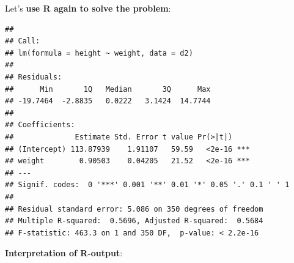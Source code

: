 \documentclass[
]{book}
\newenvironment{Shaded}{\begin{snugshade}}{\end{snugshade}}
\newcommand{\AttributeTok}[1]{\textcolor[rgb]{0.13,0.29,0.53}{#1}}
\newcommand{\DecValTok}[1]{\textcolor[rgb]{0.00,0.00,0.81}{#1}}
\newcommand{\FunctionTok}[1]{\textcolor[rgb]{0.13,0.29,0.53}{\textbf{#1}}}
\newcommand{\NormalTok}[1]{#1}
\newcommand{\OtherTok}[1]{\textcolor[rgb]{0.56,0.35,0.01}{#1}}
\newcommand{\SpecialCharTok}[1]{\textcolor[rgb]{0.81,0.36,0.00}{\textbf{#1}}}
\begin{document}
Let's \textbf{use R again to solve the problem}:

\begin{Shaded}
\end{Shaded}

\begin{verbatim}
## 
## Call:
## lm(formula = height ~ weight, data = d2)
## 
## Residuals:
##      Min       1Q   Median       3Q      Max 
## -19.7464  -2.8835   0.0222   3.1424  14.7744 
## 
## Coefficients:
##              Estimate Std. Error t value Pr(>|t|)    
## (Intercept) 113.87939    1.91107   59.59   <2e-16 ***
## weight        0.90503    0.04205   21.52   <2e-16 ***
## ---
## Signif. codes:  0 '***' 0.001 '**' 0.01 '*' 0.05 '.' 0.1 ' ' 1
## 
## Residual standard error: 5.086 on 350 degrees of freedom
## Multiple R-squared:  0.5696, Adjusted R-squared:  0.5684 
## F-statistic: 463.3 on 1 and 350 DF,  p-value: < 2.2e-16
\end{verbatim}

\textbf{Interpretation of R-output}:
\end{document}
